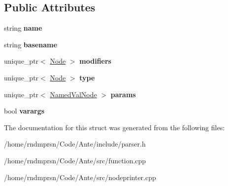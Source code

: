 \subsection*{Public Attributes}
\begin{DoxyCompactItemize}
\item 
\mbox{\label{structFuncDeclNode_a72c64abc618a8f5bb1cab1021f920080}} 
string {\bfseries name}
\item 
\mbox{\label{structFuncDeclNode_a58fe683cd412a2a8efb190fca81b6cb3}} 
string {\bfseries basename}
\item 
\mbox{\label{structFuncDeclNode_abb869e291f6c43b9d3e8ffc78266b0f5}} 
unique\+\_\+ptr$<$ \hyperlink{structNode}{Node} $>$ {\bfseries modifiers}
\item 
\mbox{\label{structFuncDeclNode_ac760d0aab5048db3219e9e60698dc056}} 
unique\+\_\+ptr$<$ \hyperlink{structNode}{Node} $>$ {\bfseries type}
\item 
\mbox{\label{structFuncDeclNode_a9c1273634041d76313a4249de5fd062a}} 
unique\+\_\+ptr$<$ \hyperlink{structNamedValNode}{Named\+Val\+Node} $>$ {\bfseries params}
\item 
\mbox{\label{structFuncDeclNode_a72f2cd342cfcfdc0ea8c3929dbc0a563}} 
bool {\bfseries varargs}
\end{DoxyCompactItemize}


The documentation for this struct was generated from the following files\+:\begin{DoxyCompactItemize}
\item 
/home/rndmprsn/\+Code/\+Ante/include/parser.\+h\item 
/home/rndmprsn/\+Code/\+Ante/src/function.\+cpp\item 
/home/rndmprsn/\+Code/\+Ante/src/nodeprinter.\+cpp\end{DoxyCompactItemize}
